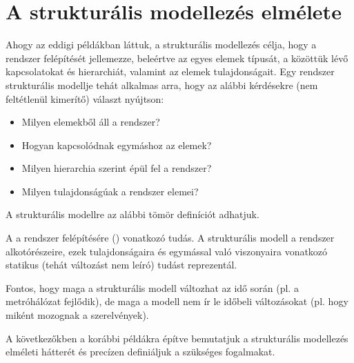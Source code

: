 \section{A strukturális modellezés elmélete}


Ahogy az eddigi példákban láttuk, a strukturális modellezés célja, hogy a rendszer felépítését jellemezze, beleértve az egyes elemek típusát, a közöttük lévő kapcsolatokat és hierarchiát, valamint az elemek tulajdonságait. Egy rendszer strukturális modellje tehát alkalmas arra, hogy az alábbi kérdésekre (nem feltétlenül kimerítő) választ nyújtson:

\begin{itemize}
	\item Milyen elemekből áll a rendszer?
	\item Hogyan kapcsolódnak egymáshoz az elemek?
	\item Milyen hierarchia szerint épül fel a rendszer?
	\item Milyen tulajdonságúak a rendszer elemei?
\end{itemize}


A strukturális modellre az alábbi tömör definíciót adhatjuk.

\begin{definicio}
	A  a rendszer felépítésére () vonatkozó tudás. A strukturális modell a rendszer alkotórészeire, ezek tulajdonságaira és egymással való viszonyaira vonatkozó statikus (tehát változást nem leíró) tudást reprezentál. %
\end{definicio}

\begin{megjegyzes}
Fontos, hogy maga a strukturális modell változhat az idő során (pl. a metróhálózat fejlődik), de maga a modell nem ír le időbeli változásokat (pl. hogy miként mozognak a szerelvények).
\end{megjegyzes}


A következőkben a korábbi példákra építve bemutatjuk a strukturális modellezés elméleti hátterét és precízen definiáljuk a szükséges fogalmakat.

